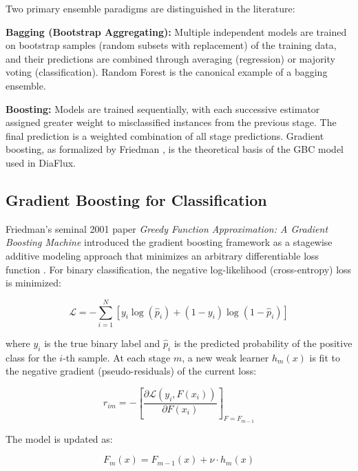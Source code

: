 \documentclass[12pt,a4paper]{report}
\begin{document}
Two primary ensemble paradigms are distinguished in the literature:

\textbf{Bagging (Bootstrap Aggregating):} Multiple independent models are trained on bootstrap samples (random subsets with replacement) of the training data, and their predictions are combined through averaging (regression) or majority voting (classification). Random Forest \cite{geron_ml} is the canonical example of a bagging ensemble.

\textbf{Boosting:} Models are trained sequentially, with each successive estimator assigned greater weight to misclassified instances from the previous stage. The final prediction is a weighted combination of all stage predictions. Gradient boosting, as formalized by Friedman \cite{friedman_gb}, is the theoretical basis of the GBC model used in DiaFlux.

\subsection{Gradient Boosting for Classification}
Friedman's seminal 2001 paper \textit{Greedy Function Approximation: A Gradient Boosting Machine} introduced the gradient boosting framework as a stagewise additive modeling approach that minimizes an arbitrary differentiable loss function \cite{friedman_gb}. For binary classification, the negative log-likelihood (cross-entropy) loss is minimized:

\begin{equation}
\mathcal{L} = -\sum_{i=1}^{N} \left[ y_i \log(\hat{p}_i) + (1 - y_i) \log(1 - \hat{p}_i) \right]
\label{eq:log_loss}
\end{equation}

where $y_i$ is the true binary label and $\hat{p}_i$ is the predicted probability of the positive class for the $i$-th sample. At each stage $m$, a new weak learner $h_m(x)$ is fit to the negative gradient (pseudo-residuals) of the current loss:

\begin{equation}
r_{im} = -\left[\frac{\partial \mathcal{L}(y_i, F(x_i))}{\partial F(x_i)}\right]_{F = F_{m-1}}
\label{eq:pseudo_residuals}
\end{equation}

The model is updated as:

\begin{equation}
F_m(x) = F_{m-1}(x) + \nu \cdot h_m(x)
\label{eq:gbm_update}
\end{equation}
\end{document}
